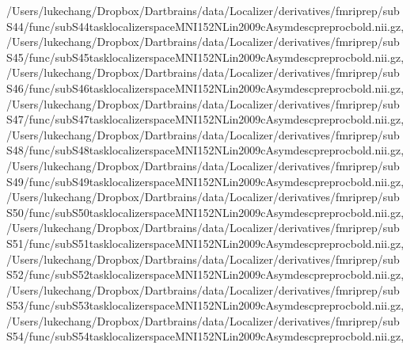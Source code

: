 \documentclass[letterpaper,10pt,english]{sphinxmanual}
\begin{document}
\begin{sphinxVerbatim}[commandchars=\\\{\}]
 \PYGZsq{}/Users/lukechang/Dropbox/Dartbrains/data/Localizer/derivatives/fmriprep/sub\PYGZhy{}S44/func/sub\PYGZhy{}S44\PYGZus{}task\PYGZhy{}localizer\PYGZus{}space\PYGZhy{}MNI152NLin2009cAsym\PYGZus{}desc\PYGZhy{}preproc\PYGZus{}bold.nii.gz\PYGZsq{},
 \PYGZsq{}/Users/lukechang/Dropbox/Dartbrains/data/Localizer/derivatives/fmriprep/sub\PYGZhy{}S45/func/sub\PYGZhy{}S45\PYGZus{}task\PYGZhy{}localizer\PYGZus{}space\PYGZhy{}MNI152NLin2009cAsym\PYGZus{}desc\PYGZhy{}preproc\PYGZus{}bold.nii.gz\PYGZsq{},
 \PYGZsq{}/Users/lukechang/Dropbox/Dartbrains/data/Localizer/derivatives/fmriprep/sub\PYGZhy{}S46/func/sub\PYGZhy{}S46\PYGZus{}task\PYGZhy{}localizer\PYGZus{}space\PYGZhy{}MNI152NLin2009cAsym\PYGZus{}desc\PYGZhy{}preproc\PYGZus{}bold.nii.gz\PYGZsq{},
 \PYGZsq{}/Users/lukechang/Dropbox/Dartbrains/data/Localizer/derivatives/fmriprep/sub\PYGZhy{}S47/func/sub\PYGZhy{}S47\PYGZus{}task\PYGZhy{}localizer\PYGZus{}space\PYGZhy{}MNI152NLin2009cAsym\PYGZus{}desc\PYGZhy{}preproc\PYGZus{}bold.nii.gz\PYGZsq{},
 \PYGZsq{}/Users/lukechang/Dropbox/Dartbrains/data/Localizer/derivatives/fmriprep/sub\PYGZhy{}S48/func/sub\PYGZhy{}S48\PYGZus{}task\PYGZhy{}localizer\PYGZus{}space\PYGZhy{}MNI152NLin2009cAsym\PYGZus{}desc\PYGZhy{}preproc\PYGZus{}bold.nii.gz\PYGZsq{},
 \PYGZsq{}/Users/lukechang/Dropbox/Dartbrains/data/Localizer/derivatives/fmriprep/sub\PYGZhy{}S49/func/sub\PYGZhy{}S49\PYGZus{}task\PYGZhy{}localizer\PYGZus{}space\PYGZhy{}MNI152NLin2009cAsym\PYGZus{}desc\PYGZhy{}preproc\PYGZus{}bold.nii.gz\PYGZsq{},
 \PYGZsq{}/Users/lukechang/Dropbox/Dartbrains/data/Localizer/derivatives/fmriprep/sub\PYGZhy{}S50/func/sub\PYGZhy{}S50\PYGZus{}task\PYGZhy{}localizer\PYGZus{}space\PYGZhy{}MNI152NLin2009cAsym\PYGZus{}desc\PYGZhy{}preproc\PYGZus{}bold.nii.gz\PYGZsq{},
 \PYGZsq{}/Users/lukechang/Dropbox/Dartbrains/data/Localizer/derivatives/fmriprep/sub\PYGZhy{}S51/func/sub\PYGZhy{}S51\PYGZus{}task\PYGZhy{}localizer\PYGZus{}space\PYGZhy{}MNI152NLin2009cAsym\PYGZus{}desc\PYGZhy{}preproc\PYGZus{}bold.nii.gz\PYGZsq{},
 \PYGZsq{}/Users/lukechang/Dropbox/Dartbrains/data/Localizer/derivatives/fmriprep/sub\PYGZhy{}S52/func/sub\PYGZhy{}S52\PYGZus{}task\PYGZhy{}localizer\PYGZus{}space\PYGZhy{}MNI152NLin2009cAsym\PYGZus{}desc\PYGZhy{}preproc\PYGZus{}bold.nii.gz\PYGZsq{},
 \PYGZsq{}/Users/lukechang/Dropbox/Dartbrains/data/Localizer/derivatives/fmriprep/sub\PYGZhy{}S53/func/sub\PYGZhy{}S53\PYGZus{}task\PYGZhy{}localizer\PYGZus{}space\PYGZhy{}MNI152NLin2009cAsym\PYGZus{}desc\PYGZhy{}preproc\PYGZus{}bold.nii.gz\PYGZsq{},
 \PYGZsq{}/Users/lukechang/Dropbox/Dartbrains/data/Localizer/derivatives/fmriprep/sub\PYGZhy{}S54/func/sub\PYGZhy{}S54\PYGZus{}task\PYGZhy{}localizer\PYGZus{}space\PYGZhy{}MNI152NLin2009cAsym\PYGZus{}desc\PYGZhy{}preproc\PYGZus{}bold.nii.gz\PYGZsq{},

\end{sphinxVerbatim}
\end{document}
